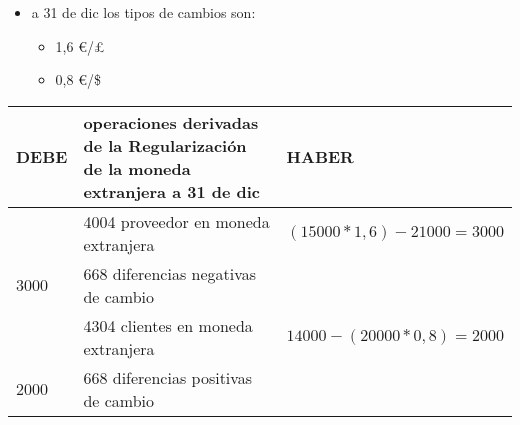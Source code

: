 \documentclass[a4paper,12pt]{article}
\begin{document}
\begin{itemize}
    \item a 31 de dic los tipos de cambios son:
    \begin{itemize}
        \item 1,6 \euro/\pounds
        \item 0,8 \euro/\$
    \end{itemize}
\end{itemize}

\begin{table}[H]
    \centering
    \begin{tabular}{|p{3cm}|p{6cm}|p{3cm}|}
    \hline
    \textbf{DEBE} & \textbf{operaciones derivadas de la Regularización de la moneda extranjera a 31 de dic} & \textbf{HABER} \\
    \hline
    & 4004 proveedor en moneda extranjera& $(15000*1,6)-21000=3000$\\
    \hline
    3000& 668 diferencias negativas de cambio& \\
    \hline
    & 4304 clientes en moneda extranjera& $14000-(20000*0,8)=2000$\\
    \hline
    2000& 668 diferencias positivas de cambio& \\
    \hline
    \end{tabular}
\end{table}
\end{document}
